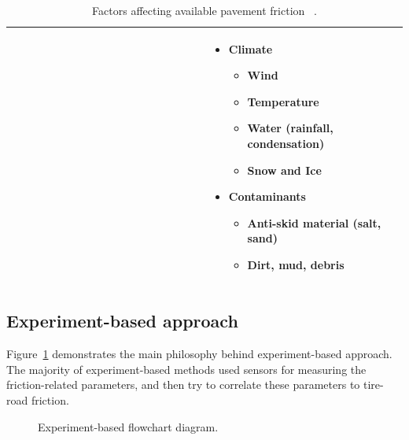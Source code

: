 \documentclass[noprint]{uit-thesis}
\begin{document}
\begin{table}[H]
\begin{tabular}{|p{0.5\linewidth} | p{0.5\linewidth} |}
& 
\begin{itemize}
 \item Climate
 \begin{itemize}
  \item Wind
  \item Temperature
  \item Water (rainfall, condensation)
  \item Snow and Ice
 \end{itemize}
 \item Contaminants 
 \begin{itemize}
  \item Anti-skid material (salt, sand)
  \item Dirt, mud, debris
 \end{itemize}
\end{itemize} \\ 

\hline

\end{tabular}
\caption{Factors affecting available pavement friction ~\citep{Friction}.}
\label{tab:fricFactors}
\end{table}





\subsection{Experiment-based approach}
Figure~\ref{fig:FlowChartExperiment} demonstrates the main philosophy behind experiment-based approach. The majority of experiment-based methods used sensors for measuring the friction-related parameters, and then try to correlate these parameters to tire-road friction. 
\par
\begin{figure} [H]
\centering

\caption{Experiment-based flowchart diagram.}
\label{fig:FlowChartExperiment}
\end{figure}
\end{document}
